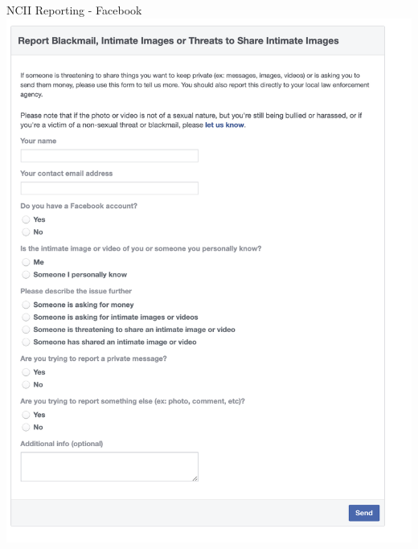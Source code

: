 \documentclass[nobackground,dvipsnames,table,aspectratio=169]{beamer}
\begin{document}
\begin{frame}{NCII Reporting - Facebook}
    \centering
    \includegraphics[height=0.85\textheight]{ncii-reporting-facebook}
\end{frame}
\end{document}
